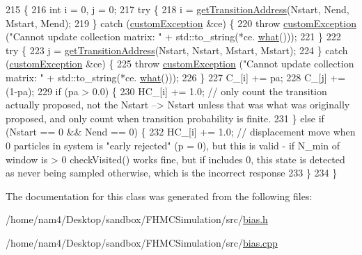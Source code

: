 \begin{DoxyCode}
215                                                                                                        \{
216     \textcolor{keywordtype}{int} i = 0, j = 0;
217     \textcolor{keywordflow}{try} \{
218         i = \hyperlink{classtmmc_ae296df3336ebf0fa1db7c34972c544eb}{getTransitionAddress}(Nstart, Nend, Mstart, Mend);
219     \} \textcolor{keywordflow}{catch} (\hyperlink{classcustom_exception}{customException} &ce) \{
220         \textcolor{keywordflow}{throw} \hyperlink{classcustom_exception}{customException} (\textcolor{stringliteral}{"Cannot update collection matrix: "} + std::to\_string(*ce.
      \hyperlink{classcustom_exception_aeb6ab5848b038adfc68fde86a512f691}{what}()));
221     \}
222     \textcolor{keywordflow}{try} \{
223         j = \hyperlink{classtmmc_ae296df3336ebf0fa1db7c34972c544eb}{getTransitionAddress}(Nstart, Nstart, Mstart, Mstart);
224     \} \textcolor{keywordflow}{catch} (\hyperlink{classcustom_exception}{customException} &ce) \{
225         \textcolor{keywordflow}{throw} \hyperlink{classcustom_exception}{customException} (\textcolor{stringliteral}{"Cannot update collection matrix: "} + std::to\_string(*ce.
      \hyperlink{classcustom_exception_aeb6ab5848b038adfc68fde86a512f691}{what}()));
226     \}
227     C\_[i] += pa;
228     C\_[j] += (1-pa);
229     \textcolor{keywordflow}{if} (pa > 0.0) \{
230         HC\_[i] += 1.0; \textcolor{comment}{// only count the transition actually proposed, not the Nstart --> Nstart unless
       that was what was originally proposed, and only count when transition probability is finite.}
231     \} \textcolor{keywordflow}{else} \textcolor{keywordflow}{if} (Nstart == 0 && Nend == 0) \{
232     HC\_[i] += 1.0; \textcolor{comment}{// displacement move when 0 particles in system is "early rejected" (p = 0), but this is
       valid - if N\_min of window is > 0 checkVisited() works fine, but if includes 0, this state is detected as
       never being sampled otherwise, which is the incorrect response}
233     \}
234 \}
\end{DoxyCode}


The documentation for this class was generated from the following files\-:\begin{DoxyCompactItemize}
\item 
/home/nam4/\-Desktop/sandbox/\-F\-H\-M\-C\-Simulation/src/\hyperlink{bias_8h}{bias.\-h}\item 
/home/nam4/\-Desktop/sandbox/\-F\-H\-M\-C\-Simulation/src/\hyperlink{bias_8cpp}{bias.\-cpp}\end{DoxyCompactItemize}
